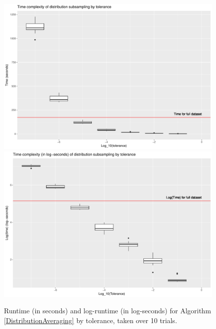 \documentclass{article}
\begin{document}
\begin{figure}
    \includegraphics[width=0.9\linewidth]{Figures/NearestNeighbor/CDR3/time_by_tol.pdf}
    \includegraphics[width=0.9\linewidth]{Figures/NearestNeighbor/CDR3/log_time_by_tol.pdf}
    \caption{Runtime (in seconds) and log-runtime (in log-seconds) for Algorithm \ref{DistributionAveraging} by tolerance, taken over 10 trials.}
    \label{fig:NNTimes}
\end{figure}
\end{document}
